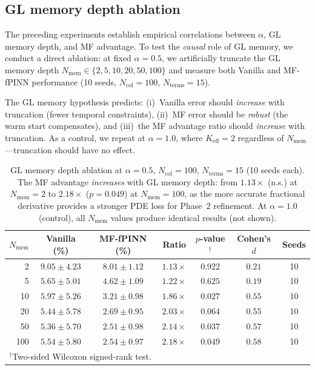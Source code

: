 \documentclass[preprint,12pt]{elsarticle}
\newcommand{\Ncol}{N_{\mathrm{col}}}
\begin{document}
\subsection{GL memory depth ablation}
\label{sec:gl_ablation}

The preceding experiments establish empirical correlations between $\alpha$, GL memory depth, and MF advantage. To test the \emph{causal} role of GL memory, we conduct a direct ablation: at fixed $\alpha = 0.5$, we artificially truncate the GL memory depth $N_{\mathrm{mem}} \in \{2, 5, 10, 20, 50, 100\}$ and measure both Vanilla and MF-fPINN performance (10 seeds, $\Ncol = 100$, $N_{\mathrm{terms}} = 15$).

The GL memory hypothesis predicts: (i)~Vanilla error should \emph{increase} with truncation (fewer temporal constraints), (ii)~MF error should be \emph{robust} (the warm start compensates), and (iii)~the MF advantage ratio should \emph{increase} with truncation. As a control, we repeat at $\alpha = 1.0$, where $K_{\mathrm{eff}} = 2$ regardless of $N_{\mathrm{mem}}$---truncation should have no effect.

\begin{table}[t]
\centering
\caption{GL memory depth ablation at $\alpha = 0.5$, $\Ncol = 100$, $N_{\mathrm{terms}} = 15$ (10 seeds each). The MF advantage \emph{increases} with GL memory depth: from $1.13\times$ (n.s.) at $N_{\mathrm{mem}} = 2$ to $2.18\times$ ($p = 0.049$) at $N_{\mathrm{mem}} = 100$, as the more accurate fractional derivative provides a stronger PDE loss for Phase~2 refinement. At $\alpha = 1.0$ (control), all $N_{\mathrm{mem}}$ values produce identical results (not shown).}
\label{tab:gl_ablation}
\begin{tabular}{rcccccc}
\toprule
$N_{\mathrm{mem}}$ & Vanilla (\%) & MF-fPINN (\%) & Ratio & $p$-value$^\dagger$ & Cohen's $d$ & Seeds \\
\midrule
  2 & $9.05 \pm 4.23$ & $8.01 \pm 1.12$ & $1.13\times$ & $0.922$ & $0.21$ & 10 \\
  5 & $5.65 \pm 5.01$ & $4.62 \pm 1.09$ & $1.22\times$ & $0.625$ & $0.19$ & 10 \\
 10 & $5.97 \pm 5.26$ & $3.21 \pm 0.98$ & $\mathbf{1.86\times}$ & $\mathbf{0.027}$ & $0.55$ & 10 \\
 20 & $5.44 \pm 5.78$ & $2.69 \pm 0.95$ & $2.03\times$ & $0.064$ & $0.55$ & 10 \\
 50 & $5.36 \pm 5.70$ & $2.51 \pm 0.98$ & $\mathbf{2.14\times}$ & $\mathbf{0.037}$ & $0.57$ & 10 \\
100 & $5.54 \pm 5.80$ & $2.54 \pm 0.97$ & $\mathbf{2.18\times}$ & $\mathbf{0.049}$ & $0.58$ & 10 \\
\bottomrule
\multicolumn{7}{l}{\small $^\dagger$Two-sided Wilcoxon signed-rank test.} \\
\end{tabular}
\end{table}
\end{document}
